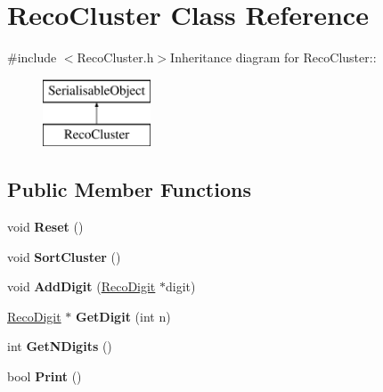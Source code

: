 \hypertarget{classRecoCluster}{
\section{RecoCluster Class Reference}
\label{classRecoCluster}
}


{\ttfamily \#include $<$RecoCluster.h$>$}Inheritance diagram for RecoCluster::\begin{figure}[H]
\begin{center}
\leavevmode
\includegraphics[height=2cm]{classRecoCluster}
\end{center}
\end{figure}
\subsection*{Public Member Functions}
\begin{DoxyCompactItemize}
\item 
\hypertarget{classRecoCluster_a615607869a350cf1997517b327301ec7}{
void {\bfseries Reset} ()}
\label{classRecoCluster_a615607869a350cf1997517b327301ec7}

\item 
\hypertarget{classRecoCluster_a51c5dfdb4b5555485ea67c678002d5d5}{
void {\bfseries SortCluster} ()}
\label{classRecoCluster_a51c5dfdb4b5555485ea67c678002d5d5}

\item 
\hypertarget{classRecoCluster_aa8ce1a0622570b319cf47662d9cf4209}{
void {\bfseries AddDigit} (\hyperlink{classRecoDigit}{RecoDigit} $\ast$digit)}
\label{classRecoCluster_aa8ce1a0622570b319cf47662d9cf4209}

\item 
\hypertarget{classRecoCluster_af9e9403e3b26e05d57b5b35c79f355f9}{
\hyperlink{classRecoDigit}{RecoDigit} $\ast$ {\bfseries GetDigit} (int n)}
\label{classRecoCluster_af9e9403e3b26e05d57b5b35c79f355f9}

\item 
\hypertarget{classRecoCluster_a4c1377575f643fb8214735f8d90570dd}{
int {\bfseries GetNDigits} ()}
\label{classRecoCluster_a4c1377575f643fb8214735f8d90570dd}

\item 
\hypertarget{classRecoCluster_aad8d0d73814c3a4f487239050d68fc0a}{
bool {\bfseries Print} ()}
\label{classRecoCluster_aad8d0d73814c3a4f487239050d68fc0a}

\end{DoxyCompactItemize}
